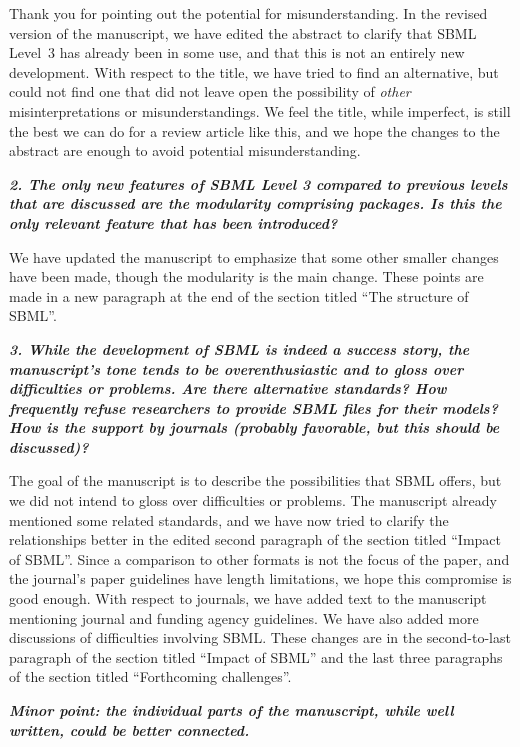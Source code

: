 \documentclass[11pt]{mhletter}
\begin{document}
Thank you for pointing out the potential for misunderstanding.  In the revised version of the manuscript, we have edited the abstract to clarify that SBML Level~3 has already been in some use, and that this is not an entirely new development.  With respect to the title, we have tried to find an alternative, but could not find one that did not leave open the possibility of \emph{other} misinterpretations or misunderstandings.  We feel the title, while imperfect, is still the best we can do for a review article like this, and we hope the changes to the abstract are enough to avoid potential misunderstanding.


\textbf{\textit{2. The only new features of SBML Level 3 compared to previous levels that are discussed are the modularity comprising packages. Is this the only relevant feature that has been introduced?}}

We have updated the manuscript to emphasize that some other smaller changes have been made, though the modularity is the main change.  These points are made in a new paragraph at the end of the section titled ``The structure of SBML''.


\textbf{\textit{3. While the development of SBML is indeed a success story, the manuscript's tone tends to be overenthusiastic and to gloss over difficulties or problems. Are there alternative standards? How frequently refuse researchers to provide SBML files for their models? How is the support by journals (probably favorable, but this should be discussed)?}}

The goal of the manuscript is to describe the possibilities that SBML offers, but we did not intend to gloss over difficulties or problems.  The manuscript already mentioned some related standards, and we have now tried to clarify the relationships better in the edited second paragraph of the section titled ``Impact of SBML''.  Since a comparison to other formats is not the focus of the paper, and the journal's paper guidelines have length limitations, we hope this compromise is good enough.  With respect to journals, we have added text to the manuscript mentioning journal and funding agency guidelines.  We have also added more discussions of difficulties involving SBML.  These changes are in the second-to-last paragraph of the section titled ``Impact of SBML'' and the last three paragraphs of the section titled ``Forthcoming challenges''.


\textbf{\textit{Minor point: the individual parts of the manuscript, while well written, could be better connected.}}
\end{document}
